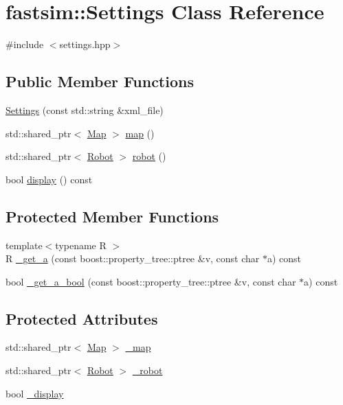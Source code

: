 \hypertarget{classfastsim_1_1_settings}{}\section{fastsim\+:\+:Settings Class Reference}
\label{classfastsim_1_1_settings}


{\ttfamily \#include $<$settings.\+hpp$>$}

\subsection*{Public Member Functions}
\begin{DoxyCompactItemize}
\item 
\hyperlink{classfastsim_1_1_settings_a6c09cdd2d888b82daa15107bf5ba0813}{Settings} (const std\+::string \&xml\+\_\+file)
\item 
std\+::shared\+\_\+ptr$<$ \hyperlink{classfastsim_1_1_map}{Map} $>$ \hyperlink{classfastsim_1_1_settings_a325ee1931c4f732a364025ae44d3bb77}{map} ()
\item 
std\+::shared\+\_\+ptr$<$ \hyperlink{classfastsim_1_1_robot}{Robot} $>$ \hyperlink{classfastsim_1_1_settings_a46cc8a38e569ebaf7ba774824c2e35ef}{robot} ()
\item 
bool \hyperlink{classfastsim_1_1_settings_a7a177a4ccf723c1e46773864272fbad0}{display} () const 
\end{DoxyCompactItemize}
\subsection*{Protected Member Functions}
\begin{DoxyCompactItemize}
\item 
{\footnotesize template$<$typename R $>$ }\\R \hyperlink{classfastsim_1_1_settings_af48f04ccfcdec0d593fb4f72630acffa}{\+\_\+get\+\_\+a} (const boost\+::property\+\_\+tree\+::ptree \&v, const char $\ast$a) const 
\item 
bool \hyperlink{classfastsim_1_1_settings_ac092452e3980d440df8a7fcfbbe80665}{\+\_\+get\+\_\+a\+\_\+bool} (const boost\+::property\+\_\+tree\+::ptree \&v, const char $\ast$a) const 
\end{DoxyCompactItemize}
\subsection*{Protected Attributes}
\begin{DoxyCompactItemize}
\item 
std\+::shared\+\_\+ptr$<$ \hyperlink{classfastsim_1_1_map}{Map} $>$ \hyperlink{classfastsim_1_1_settings_a005d49dd8065e48c8db46e76cad998f8}{\+\_\+map}
\item 
std\+::shared\+\_\+ptr$<$ \hyperlink{classfastsim_1_1_robot}{Robot} $>$ \hyperlink{classfastsim_1_1_settings_aad11d2d2a9a48ef415efd0b458e6f81a}{\+\_\+robot}
\item 
bool \hyperlink{classfastsim_1_1_settings_a4d8ab7ae7af20ff4a63c4b6330b3ade2}{\+\_\+display}
\end{DoxyCompactItemize}


